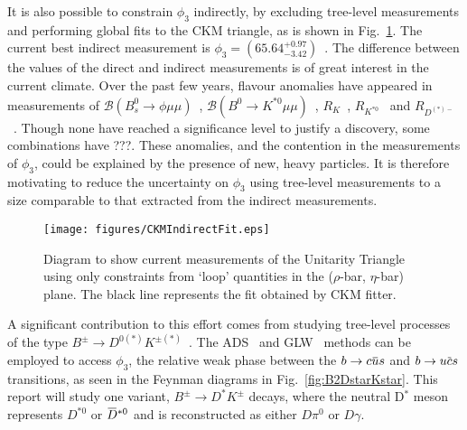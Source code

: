 \documentclass[oneside,12pt]{article}
\newcommand{\overbar}[1]{\mkern 1.5mu\overline{\mkern-1.5mu#1\mkern-1.5mu}\mkern
1.5mu}
\begin{document}
It is also possible to constrain $\phi_3$ indirectly, by excluding tree-level
measurements and performing global fits to the CKM triangle, as is shown in
Fig.~\ref{fig:CKMIndirectFit}. The current best indirect measurement is
$\phi_3=(65.64^{+0.97}_{-3.42})$\degree~\cite{website:CKMFitter}. The
difference between the values of the direct and indirect measurements is of
great interest in the current climate. Over the past few years, flavour
anomalies have appeared in measurements of $\mathcal{B} (B^{0}_{s}\rightarrow
\phi \mu \mu)$~\cite{B2phimumu}, $\mathcal{B} (B^{0}\rightarrow K^{*0} \mu
\mu)$~\cite{B2Kstmumu}, $R_{K}$~\cite{Rk}, $R_{K^{*0}}$~\cite{Rkst} and
$R_{D^{(*)-}}$~\cite{RDst}. Though none have reached a significance level to
justify a discovery, some combinations have ???. These anomalies, and the
contention in the measurements of $\phi_3$, could be explained by the presence
of new, heavy particles. It is therefore motivating to reduce the uncertainty
on $\phi_{3}$ using tree-level measurements to a size comparable to that
extracted from the indirect measurements.
\begin{figure}[H]
	\centering \texttt{[image: figures/CKMIndirectFit.eps]}
\caption{\small{Diagram to show current measurements of the Unitarity Triangle
using only constraints from `loop' quantities in the ($\rho$-bar, $\eta$-bar)
plane. The black line represents the fit obtained by CKM fitter.}}
\label{fig:CKMIndirectFit} \vspace{-10pt}
\end{figure}
A significant contribution to this effort comes from studying tree-level
processes of the type $B^{\pm}\rightarrow D^{0(*)}K^{\pm (*)}$~\cite{B2DKD2hh,
DalitzRun1, DalitzRun2, B2DKstD2hh, B2DstKD2hh}. The ADS~\cite{ADSRef} and
GLW~\cite{GLWRef} methods can be employed to access $\phi_3$, the relative weak
phase between the $b\rightarrow c\overbar{u}s$ and $b\rightarrow u\overbar{c}s$
transitions, as seen in the Feynman diagrams in Fig.~\ref{fig:B2DstarKstar}.
This report will study one variant, $B^{\pm}\rightarrow D^{*}K^{\pm}$ decays,
where the neutral D$^{*}$ meson represents $D^{*0}$ or $\overbar{D}^{*0}$ and
is reconstructed as either $D\pi^{0}$ or $D\gamma$. 
\end{document}

